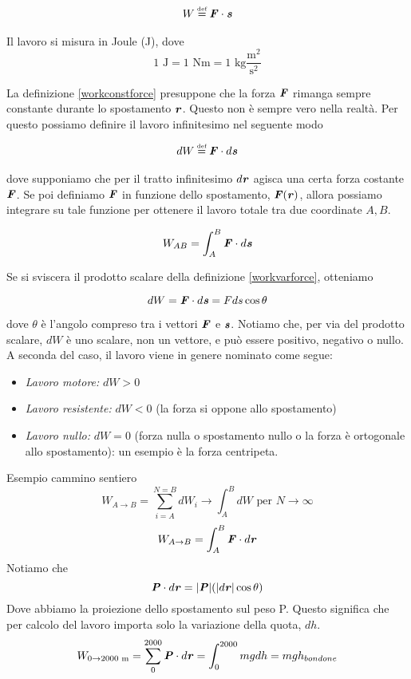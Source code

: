 \begin{align}
W \eqdef \vecsymb{F}\cdot\vecsymb{s}\label{workconstforce}
\end{align}

\noindent Il lavoro si misura in Joule (J), dove
\[ 1\text{ J} = 1\text{ Nm} = 1\text{ kg$\frac{\text{m}^2}{\text{s}^2}$} \]

La definizione \ref{workconstforce} presuppone che la forza $\textbf{\textit{F}}$
rimanga sempre constante durante lo spostamento $\textbf{\textit{r}}$. Questo non è
sempre vero nella realtà. Per questo possiamo definire il lavoro infinitesimo
nel seguente modo

\begin{align}
    dW \eqdef \vecsymb{F} \cdot d\vecsymb{s}\label{workvarforce}
\end{align}

\noindent dove supponiamo che per il tratto infinitesimo $d\textbf{\textit{r}}$ agisca
una certa forza costante $\textbf{\textit{F}}$. Se poi definiamo $\textbf{\textit{F}}$ in
funzione dello spostamento, $\textbf{\textit{F}}(\textbf{\textit{r}})$, allora possiamo integrare
su tale funzione per ottenere il lavoro totale tra due coordinate $A,B$.

\begin{align}
    W_{AB} = \int_{A}^{B}\textbf{\textit{F}}\cdot d\textbf{\textit{s}}
\end{align}

\noindent Se si sviscera il prodotto scalare della definizione \ref{workvarforce},
otteniamo

\[ dW = \textbf{\textit{F}}\cdot d\textbf{\textit{s}} = Fds\cos\theta \]

\noindent dove $\theta$ è l'angolo compreso tra i vettori $\textbf{\textit{F}}$
e $\textbf{\textit{s}}$. Notiamo che, per via del prodotto scalare, $dW$ è uno scalare, non un vettore, e
può essere positivo, negativo o nullo. A seconda del caso, il lavoro
viene in genere nominato come segue:

\begin{itemize}
    \item \textit{Lavoro motore:} $dW > 0$
    \item \textit{Lavoro resistente:} $dW < 0$ (la forza si oppone allo spostamento)
    \item \textit{Lavoro nullo:} $dW = 0$ (forza nulla o spostamento nullo o la forza è ortogonale allo spostamento): un
    esempio è la forza centripeta.
\end{itemize}


Esempio cammino sentiero
\[ W_{A\to B} = \sum_{i = A}^{N = B}dW_i \to \int_{A}^{B}dW \text{ per } N\to\infty \]
\[ W_{A\to B} = \int_{A}^{B}\textbf{\textit{F}}\cdot d\textbf{\textit{r}} \]
Notiamo che 
\[ \textbf{\textit{P}}\cdot d\textbf{\textit{r}} = |\textbf{\textit{P}}| (|d\textbf{\textit{r}}|\cos\theta) \]
Dove abbiamo la proiezione dello spostamento sul peso P. Questo significa che
per calcolo del lavoro importa solo la variazione della quota, $dh$.
\[ W_{0\to 2000\text{ m}} = \sum_{0}^{2000}\textbf{\textit{P}}\cdot d\textbf{\textit{r}} = \int_{0}^{2000}mg dh = mgh_{bondone} \]

